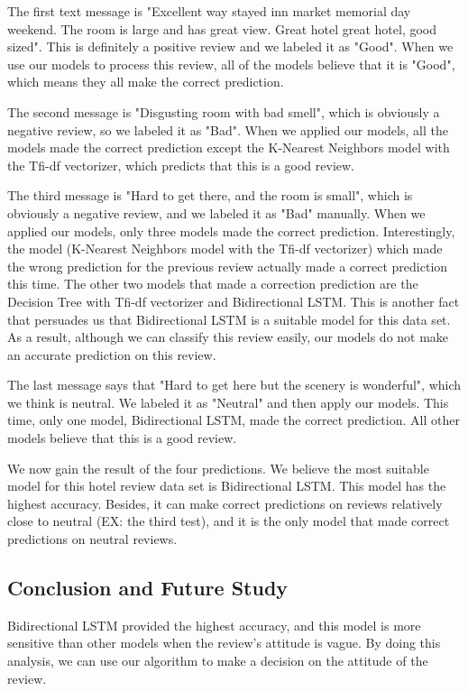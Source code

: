\documentclass{article}
\begin{document}
\noindent
The first text message is "Excellent way stayed inn market memorial day weekend. The room is large and has great view. Great hotel great hotel, good sized". This is definitely a positive review and we labeled it as "Good". When we use our models to process this review, all of the models believe that it is "Good", which means they all make the correct prediction. \newline

\noindent
The second message is "Disgusting room with bad smell", which is obviously a negative review, so we labeled it as "Bad". When we applied our models, all the models made the correct prediction except the K-Nearest Neighbors model with the Tfi-df vectorizer, which predicts that this is a good review. \newline

\noindent
The third message is "Hard to get there, and the room is small", which is obviously a negative review, and we labeled it as "Bad" manually. When we applied our models, only three models made the correct prediction. Interestingly, the model (K-Nearest Neighbors model with the Tfi-df vectorizer) which made the wrong prediction for the previous review actually made a correct prediction this time. The other two models that made a correction prediction are the Decision Tree with Tfi-df vectorizer and Bidirectional LSTM. This is another fact that persuades us that Bidirectional LSTM is a suitable model for this data set. As a result, although we can classify this review easily, our models do not make an accurate prediction on this review. \newline

\noindent
The last message says that "Hard to get here but the scenery is wonderful", which we think is neutral. We labeled it as "Neutral" and then apply our models. This time, only one model, Bidirectional LSTM, made the correct prediction. All other models believe that this is a good review. \newline

\noindent
We now gain the result of the four predictions. We believe the most suitable model for this hotel review data set is Bidirectional LSTM. This model has the highest accuracy. Besides, it can make correct predictions on reviews relatively close to neutral (EX: the third test), and it is the only model that made correct predictions on neutral reviews.

\subsection{Conclusion and Future Study}
Bidirectional LSTM provided the highest accuracy, and this model is more sensitive than other models when the review's attitude is vague. By doing this analysis, we can use our algorithm to make a decision on the attitude of the review. \newline
\end{document}
